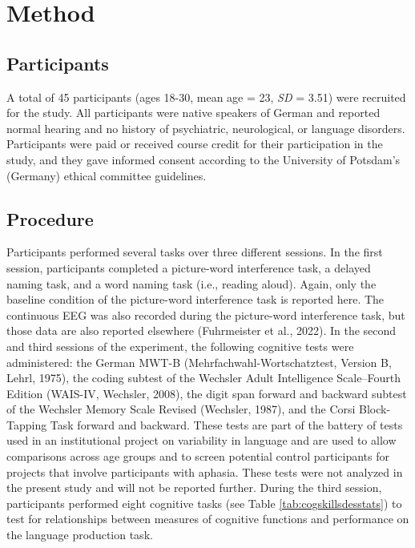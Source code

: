 \documentclass[
  man,floatsintext]{apa6}
\begin{document}
\hypertarget{method}{%
\section{Method}\label{method}}

\hypertarget{participants}{%
\subsection{Participants}\label{participants}}

A total of 45 participants (ages 18-30, mean age = 23, \emph{SD} = 3.51) were recruited for the study. All participants were native speakers of German and reported normal hearing and no history of psychiatric, neurological, or language disorders. Participants were paid or received course credit for their participation in the study, and they gave informed consent according to the University of Potsdam's (Germany) ethical committee guidelines.

\hypertarget{procedure}{%
\subsection{Procedure}\label{procedure}}

Participants performed several tasks over three different sessions. In the first session, participants completed a picture-word interference task, a delayed naming task, and a word naming task (i.e., reading aloud). Again, only the baseline condition of the picture-word interference task is reported here. The continuous EEG was also recorded during the picture-word interference task, but those data are also reported elsewhere (Fuhrmeister et al., 2022). In the second and third sessions of the experiment, the following cognitive tests were administered: the German MWT-B (Mehrfachwahl-Wortschatztest, Version B, Lehrl, 1975), the coding subtest of the Wechsler Adult Intelligence Scale--Fourth Edition (WAIS-IV, Wechsler, 2008), the digit span forward and backward subtest of the Wechsler Memory Scale Revised (Wechsler, 1987), and the Corsi Block-Tapping Task forward and backward. These tests are part of the battery of tests used in an institutional project on variability in language and are used to allow comparisons across age groups and to screen potential control participants for projects that involve participants with aphasia. These tests were not analyzed in the present study and will not be reported further. During the third session, participants performed eight cognitive tasks (see Table \ref{tab:cogskillsdesstats}) to test for relationships between measures of cognitive functions and performance on the language production task.
\end{document}

